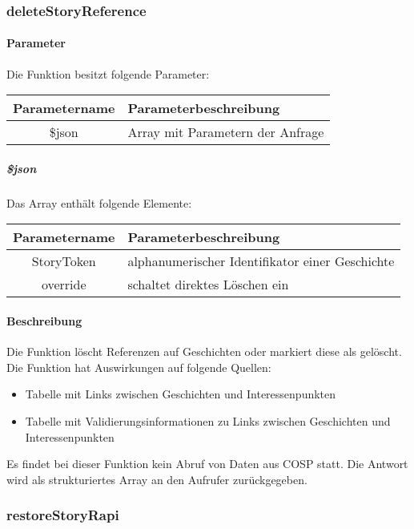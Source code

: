 \subsubsection{deleteStoryReference}
\paragraph{Parameter} Die Funktion besitzt folgende Parameter:
\begin{table}[H]
	\begin{tabular}{|c|p{11cm}|}
		\hline
		\textbf{Parametername} & \textbf{Parameterbeschreibung} \\ \hline
		\$json & Array mit Parametern der Anfrage \\ \hline
	\end{tabular}
\end{table}
\subparagraph{\$json}Das Array enthält folgende Elemente:
\begin{table}[H]
	\begin{tabular}{|c|p{11cm}|}
		\hline
		\textbf{Parametername} & \textbf{Parameterbeschreibung} \\ \hline
		StoryToken & alphanumerischer Identifikator einer Geschichte \\ \hline
		override   & schaltet direktes Löschen ein \\ \hline
	\end{tabular}
\end{table}
\paragraph{Beschreibung} Die Funktion löscht Referenzen auf Geschichten oder markiert diese als gelöscht. Die Funktion hat Auswirkungen auf folgende Quellen:
\begin{itemize}
	\item Tabelle mit Links zwischen Geschichten und Interessenpunkten
	\item Tabelle mit Validierungsinformationen zu Links zwischen Geschichten und Interessenpunkten
\end{itemize}
Es findet bei dieser Funktion kein Abruf von Daten aus {\glqq COSP\grqq} statt. Die Antwort wird als strukturiertes Array an den Aufrufer zurückgegeben.
\subsubsection{restoreStoryRapi}
